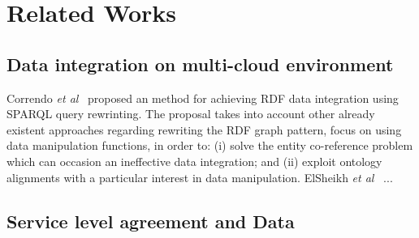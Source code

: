 \section{Related Works}\label{sec:rw}

\subsection{Data integration on multi-cloud environment}
Correndo \textit{et al}~\cite{075} proposed an method for achieving RDF data integration
using SPARQL query rewrinting. 
The proposal takes into account other already existent approaches regarding rewriting 
the RDF graph pattern, focus on using data manipulation functions, in order to: (i) solve 
the entity co-reference problem which can occasion an ineffective data integration; 
and (ii) exploit ontology alignments with a particular interest in data manipulation. 
ElSheikh \textit{et al}~\cite{078} ...

\subsection{Service level agreement and Data}
